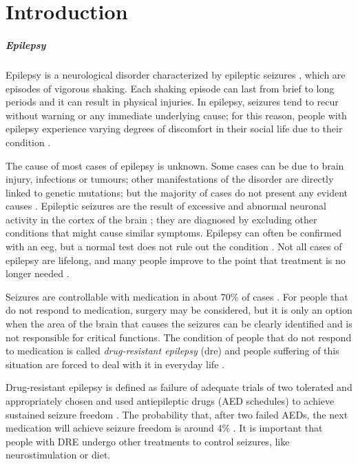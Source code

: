 
\chapter{Introduction} \label{chap: introduction}

\paragraph{Epilepsy} Epilepsy is a neurological disorder characterized by epileptic seizures \cite{NEJM:epilepsy}\cite{Epilepsia:epilepsy}, which are episodes of vigorous shaking. Each shaking episode can last from brief to long periods and it can result in physical injuries. In epilepsy, seizures tend to recur without warning or any immediate underlying cause; for this reason, people with epilepsy experience varying degrees of discomfort in their social life due to their condition \cite{WHO:epilepsy}.

The cause of most cases of epilepsy is unknown. Some cases can be due to brain injury, infections or tumours; other manifestations of the disorder are directly linked to genetic mutations; but the majority of cases do not present any evident causes \cite{WHO:epilepsy}. Epileptic seizures are the result of excessive and abnormal neuronal activity in the cortex of the brain \cite{Epilepsia:epilepsy}; they are diagnosed by excluding other conditions that might cause similar symptoms. Epilepsy can often be confirmed with an \acf{eeg}, but a normal test does not rule out the condition \cite{Hpim:seizuresandepilepsy}. Not all cases of epilepsy are lifelong, and many people improve to the point that treatment is no longer needed \cite{WHO:epilepsy}.

Seizures are controllable with medication in about 70\% of cases \cite{ERN:treatmentofepilepsy}. For people that do not respond to medication, surgery may be considered, but it is only an option when the area of the brain that causes the seizures can be clearly identified and is not responsible for critical functions. The condition of people that do not respond to medication is called \textit{drug-resistant epilepsy} (\acs{dre}) and people suffering of this situation are forced to deal with it in everyday life \cite{Epilepsia:DRE}.

Drug-resistant epilepsy is defined as failure of adequate trials of two tolerated and appropriately chosen and used antiepileptic drugs (AED schedules) to achieve sustained seizure freedom \cite{Epilepsia:DRE}. The probability that, after two failed AEDs, the next medication will achieve seizure freedom is around 4\% \cite{NEJM:DRE}. It is important that people with DRE undergo other treatments to control seizures, like neurostimulation or diet.

